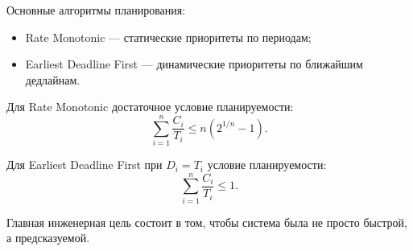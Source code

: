 \documentclass[12pt,a4paper]{article}
\begin{document}
Основные алгоритмы планирования:
\begin{itemize}
    \item Rate Monotonic --- статические приоритеты по периодам;
    \item Earliest Deadline First --- динамические приоритеты по ближайшим дедлайнам.
\end{itemize}

Для Rate Monotonic достаточное условие планируемости:
\[
    \sum_{i=1}^{n} \frac{C_i}{T_i}
    \leq
    n(2^{1/n} - 1).
\]

Для Earliest Deadline First при $D_i=T_i$ условие планируемости:
\[
    \sum_{i=1}^{n} \frac{C_i}{T_i}
    \leq 1.
\]

Главная инженерная цель состоит в том, чтобы система была не просто быстрой, а предсказуемой.
\end{document}

